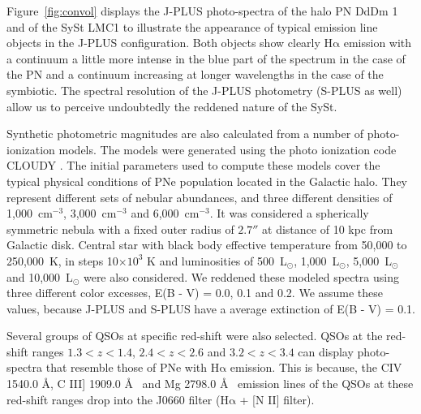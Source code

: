 \documentclass{article}
\newcommand\ha{\ensuremath{\mathrm{H\alpha}}}
\begin{document}
Figure~\ref{fig:convol} displays the J-PLUS photo-spectra of the halo PN DdDm 1 \citep{Kwitter:1998} and of the SySt LMC1 \citet{Munari:2002} to illustrate the appearance of typical emission line objects in the J-PLUS configuration.  Both objects show clearly \ha{} emission with a continuum a little more intense in the blue part of the spectrum in the case of the PN and a continuum increasing at longer wavelengths in the case of the symbiotic. The spectral resolution of the J-PLUS photometry (S-PLUS as well) allow us to perceive undoubtedly the reddened nature of the SySt. 

Synthetic photometric magnitudes are also calculated from a number of photo-ionization models. The models were generated using the photo ionization code CLOUDY \citep{Ferland:2013}. The initial parameters used to compute these models cover the typical physical conditions of PNe population located in the Galactic halo. They represent different sets of nebular abundances, and three different densities of 1,000~$\mathrm{cm^{-3}}$, 3,000~$\mathrm{cm^{-3}}$ and 6,000~$\mathrm{cm^{-3}}$. It was considered a spherically symmetric nebula with a fixed outer radius of \(2.7''\) at distance of 10 kpc from Galactic disk. Central star with black body effective temperature from 50,000 to 250,000~K, in steps 10$\times 10^3$ K and luminosities of 500~L$_{\odot}$, 1,000~L$_{\odot}$, 5,000~L$_{\odot}$ and 10,000~L$_{\odot}$ were also considered. We reddened these modeled spectra using three different  color excesses,  E(B - V) = 0.0, 0.1 and 0.2. We assume these values, because J-PLUS and S-PLUS have a average extinction of E(B - V) = 0.1.

Several groups of QSOs at specific red-shift were also selected. QSOs at the red-shift ranges \(1.3 < z < 1.4\), \(2.4 < z < 2.6\) and \(3.2 < z < 3.4\) can display photo-spectra that resemble those of PNe with \ha{} emission.  This is because, the CIV 1540.0 \AA, C III]  1909.0 \AA~ and Mg  2798.0 \AA~ emission lines of the QSOs at these red-shift ranges drop into the J0660 filter (\ha{} + [N II] filter). 



 
\end{document}
